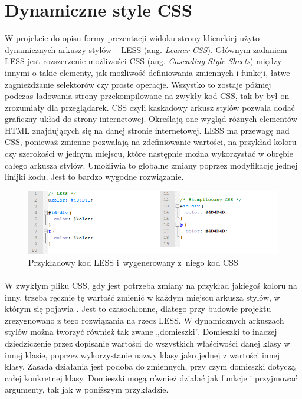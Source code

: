 \section{Dynamiczne style CSS}
W projekcie do opisu formy prezentacji widoku strony klienckiej użyto dynamicznych arkuszy stylów – LESS (ang. \textit{Leaner CSS}). Głównym zadaniem LESS jest rozszerzenie możliwości CSS (ang. \textit{Cascading Style Sheets}) między innymi o takie elementy, jak możliwość definiowania zmiennych i funkcji, łatwe zagnieżdżanie selektorów czy proste operacje. Wszystko to zostaje później podczas ładowania strony przekompilowane na zwykły kod CSS, tak by był on zrozumiały dla przeglądarek. CSS czyli kaskadowy arkusz stylów pozwala dodać graficzny układ do strony internetowej. Określają one wygląd różnych elementów HTML znajdujących się na danej stronie internetowej. 
LESS ma przewagę nad CSS, ponieważ zmienne pozwalają na zdefiniowanie wartości, na przykład koloru czy szerokości w jednym miejscu, które następnie można wykorzystać w obrębie całego arkusza stylów. Umożliwia to globalne zmiany poprzez modyfikację jednej linijki kodu. Jest to bardzo wygodne rozwiązanie. 

\begin{figure}[h]
	\centering
	\includegraphics[width=1.00\textwidth]{images/less1.png}
	\caption{Przykładowy kod LESS i~wygenerowany z~niego kod CSS}
\end{figure}
\paragraph{}
W zwykłym pliku CSS, gdy jest potrzeba zmiany na przykład jakiegoś koloru na inny, trzeba ręcznie tę wartość zmienić w każdym miejscu arkusza stylów, w którym się pojawia \cite{cssBook}. Jest to czasochłonne, dlatego przy budowie projektu zrezygnowano z tego rozwiązania na rzecz LESS. 
W dynamicznych arkuszach stylów można tworzyć również tak zwane „domieszki”. Domieszki to inaczej dziedziczenie przez dopisanie wartości do wszystkich właściwości danej klasy w innej klasie, poprzez wykorzystanie nazwy klasy jako jednej z wartości innej klasy. Zasada działania jest podoba do zmiennych, przy czym domieszki dotyczą całej konkretnej klasy. Domieszki mogą również działać jak funkcje i przyjmować argumenty, tak jak w poniższym przykładzie.

